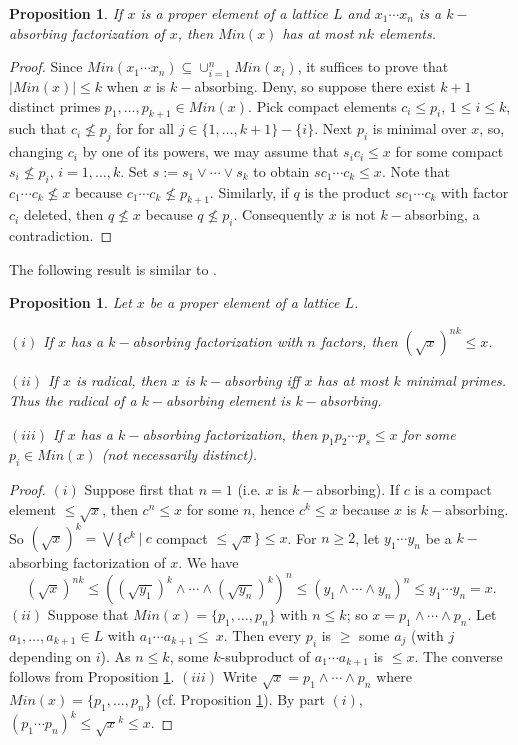 \documentclass{amsart}
\theoremstyle{plain}
\newtheorem{proposition}[theorem]{Proposition}
\theoremstyle{definition}
\theoremstyle{remark}
\begin{document}
\begin{proposition}\label{4}
If $x$ is a proper element of a lattice $L$ and  $x_1\cdots x_n$ is a $k-$absorbing factorization of $x$, then $Min(x)$ has at most $nk$ elements.
\end{proposition}

\begin{proof}
Since $Min(x_1\cdots x_n)\subseteq \cup_{i=1}^n Min(x_i)$, it suffices to prove that $|Min(x)|\leq k$ when $x$ is   $k-$absorbing.
Deny, so suppose there exist $k+1$ distinct primes $p_1,\ldots , p_{k+1}\in Min(x)$. Pick compact elements $c_i\leq p_i$, $1\leq i \leq k$, such that $c_i\not\leq p_j$ for for all $j\in\{1,\ldots,k+1\}-\{i\}$. 
Next $p_i$ is minimal over $x$, so, changing $c_i$ by one of its powers, we may assume that   $s_ic_i\leq x$ for some compact $s_i\not\leq p_i$, $i=1,\ldots,k$.
Set $s:=s_1\vee \cdots \vee s_k$ to obtain $sc_1\cdots c_k\leq x$.
Note that $c_1\cdots c_k\not\leq x$ because $c_1\cdots c_k\not\leq p_{k+1}$. Similarly, if $q$ is the product $sc_1\cdots c_k$ with factor $c_i$ deleted, then $q\not\leq x$ because $q\not\leq p_i$. Consequently $x$ is not $k-$absorbing, a contradiction.
\end{proof}


The following   result is similar to \cite[Lemma 3.3]{RU}.

\begin{proposition}\label{5}
Let $x$ be a proper element of a   lattice $L$.

$(i)$ If $x$ has a $k-$absorbing factorization with $n$ factors, then $(\sqrt{x})^{nk}\leq x$. 

$(ii)$ If $x$ is radical, then $x$ is  $k-$absorbing iff $x$ has at most 
$k$ minimal primes. Thus the radical of 
a $k-$absorbing element is $k-$absorbing.

$(iii)$ If $x$ has a $k-$absorbing factorization, then 
$p_1p_2\cdots p_s\leq x$ for some  $p_i\in Min(x)$ (not necessarily distinct).
\end{proposition}
\begin{proof}
$(i)$ Suppose first that $n=1$ (i.e. $x$ is  $k-$absorbing). If $c$ is a compact element $\leq \sqrt{x}$, then $c^n\leq x$ for some $n$, hence   $c^k\leq x$ because $x$ is  $k-$absorbing. So $(\sqrt{x})^k = \bigvee \{c^k \ |\ c $ compact $ \leq \sqrt{x}\} \leq x$.
For $n\geq 2$, let  $y_1\cdots y_n$ be a $k-$absorbing factorization of $x$. We have
$$ (\sqrt{x})^{nk} \leq ((\sqrt{y_1})^k\wedge \cdots \wedge (\sqrt{y_n})^k)^n \leq (y_1\wedge \cdots \wedge y_n)^n \leq y_1\cdots y_n =x.$$ 
%
$(ii)$ Suppose that $Min(x)=\{p_1,\ldots,p_n\}$ with $n\leq k$; so
$x=p_1\wedge \cdots\wedge p_n$.
Let $a_1,\ldots,a_{k+1}\in L$ with $a_1\cdots a_{k+1}\leq\ {x}$. Then every $p_i$ is $\geq$ some $a_j$ (with $j$ depending on $i$). As $n\leq k$, some $k$-subproduct of $a_1\cdots a_{k+1}$ is $\leq x$. The converse follows from Proposition \ref{4}.
$(iii)$ Write  $\sqrt{x}=p_1\wedge \cdots\wedge p_n$ where $Min(x)=\{p_1,\ldots,p_n\}$ (cf. Proposition \ref{4}). 
By part $(i)$,  $(p_1 \cdots p_n)^k\leq \sqrt{x}^k\leq x.$
\end{proof}
\end{document}
